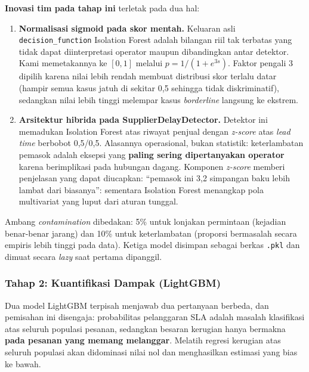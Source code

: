 \documentclass[12pt,a4paper]{article}
\begin{document}
\textbf{Inovasi tim pada tahap ini} terletak pada dua hal:

\begin{enumerate}
  \item \textbf{Normalisasi sigmoid pada skor mentah.} Keluaran asli \texttt{decision\_function} Isolation Forest adalah bilangan riil tak terbatas yang tidak dapat diinterpretasi operator maupun dibandingkan antar detektor. Kami memetakannya ke $[0,1]$ melalui $p = 1/(1+e^{3s})$. Faktor pengali 3 dipilih karena nilai lebih rendah membuat distribusi skor terlalu datar (hampir semua kasus jatuh di sekitar 0,5 sehingga tidak diskriminatif), sedangkan nilai lebih tinggi melempar kasus \textit{borderline} langsung ke ekstrem.

  \item \textbf{Arsitektur hibrida pada SupplierDelayDetector.} Detektor ini memadukan Isolation Forest atas riwayat penjual dengan \textit{z-score} atas \textit{lead time} berbobot 0,5/0,5. Alasannya operasional, bukan statistik: keterlambatan pemasok adalah eksepsi yang \textbf{paling sering dipertanyakan operator} karena berimplikasi pada hubungan dagang. Komponen \textit{z-score} memberi penjelasan yang dapat diucapkan: ``pemasok ini 3,2 simpangan baku lebih lambat dari biasanya'': sementara Isolation Forest menangkap pola multivariat yang luput dari aturan tunggal.
\end{enumerate}

Ambang \textit{contamination} dibedakan: 5\% untuk lonjakan permintaan (kejadian benar-benar jarang) dan 10\% untuk keterlambatan (proporsi bermasalah secara empiris lebih tinggi pada data). Ketiga model disimpan sebagai berkas \texttt{.pkl} dan dimuat secara \textit{lazy} saat pertama dipanggil.

\subsubsection{Tahap 2: Kuantifikasi Dampak (LightGBM)}

Dua model LightGBM terpisah menjawab dua pertanyaan berbeda, dan pemisahan ini disengaja: probabilitas pelanggaran SLA adalah masalah klasifikasi atas seluruh populasi pesanan, sedangkan besaran kerugian hanya bermakna \textbf{pada pesanan yang memang melanggar}. Melatih regresi kerugian atas seluruh populasi akan didominasi nilai nol dan menghasilkan estimasi yang bias ke bawah.
\end{document}
